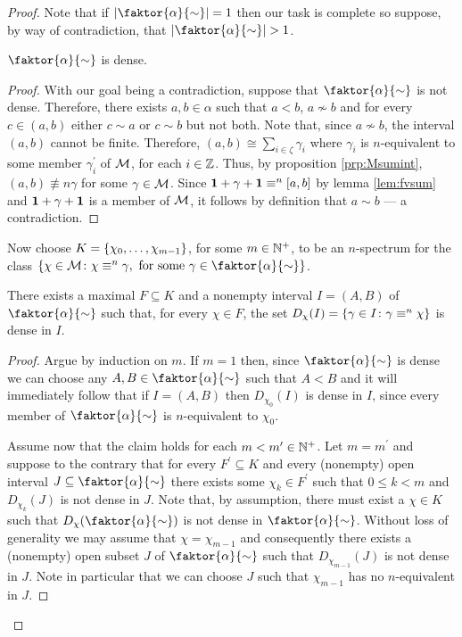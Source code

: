 \begin{proof}
	Note that if $\card{\faktor{\alpha}{\sim}}=1$ then our task is complete so
	suppose, by way of contradiction, that $\card{\faktor{\alpha}{\sim}}>1$.
	\begin{claim} $\faktor{\alpha}{\sim}$ is dense.
	\end{claim}
	\begin{proof} With our goal being a contradiction, suppose that
		$\faktor{\alpha}{\sim}$ is not dense.  Therefore, there exists $a,b\in\alpha$
		such that $a<b$, $a\not\sim b$ and for every $c\in(a,b)$ either $c\sim a$ or
		$c\sim b$ but not both.  Note that, since $a\not\sim b$, the interval $(a,b)$
		cannot be finite.  Therefore, $(a,b)\cong\sum_{i\in\zeta}\gamma_i$ where
		$\gamma_i$ is $n$-equivalent to some member $\gamma_i^\prime$ of $\mathcal{M}$, for each
		$i\in\mathbb{Z}$.  Thus, by proposition \ref{prp:Msumint}, $(a,b)\nequiv{n}\gamma$
		for some $\gamma\in\mathcal{M}$.  Since $\mathbf{1}+\gamma+\mathbf{1}\equiv^{n}[a,b]$ by lemma
		\ref{lem:fvsum} and $\mathbf{1}+\gamma+\mathbf{1}$ is a member of $\mathcal{M}$, it follows by
		definition that $a\sim b$ --- a contradiction.
	\end{proof}

	Now choose $K=\left\lbrace \chi_0,\dotsc,\chi_{m-1}\right\rbrace$, for some $m\in\mathbb{N}^{+}$, to
	be an $n$-spectrum for the class
	$\setbuild{\chi\in\M}{\chi\nequiv{n}\gamma,\text{ for some
			}\gamma\in\faktor{\alpha}{\sim}}$.
	\begin{claim} There exists a maximal $F\subseteq K$ and a nonempty interval
		$I=(A,B)$ of $\faktor{\alpha}{\sim}$ such that, for every $\chi\in F$, the set
		$D_\chi(I)=\left\lbrace \gamma\in I\colon \gamma\equiv^{n}\chi \right\rbrace$ is dense in $I$.
	\end{claim}
	\begin{proof} Argue by induction on $m$.  If $m=1$ then, since
		$\faktor{\alpha}{\sim}$ is dense we can choose any $A,B\in\faktor{\alpha}{\sim}$
		such that $A<B$ and it will immediately follow that if $I=(A,B)$ then
		$D_{\chi_0}(I)$ is dense in $I$, since every member of $\faktor{\alpha}{\sim}$
		is $n$-equivalent to $\chi_0$.

		Assume now that the claim holds for each $m<m^\prime\in\mathbb{N}^{+}$.  Let
		$m=m^\prime$ and suppose to the contrary that for every $F^\prime\subseteq K$
		and every (nonempty) open interval $J\subseteq\faktor{\alpha}{\sim}$ there
		exists some $\chi_k\in F^\prime$ such that $0\leq k<m$ and $D_{\chi_k}(J)$ is
		not dense in $J$.  Note that, by assumption, there must exist a $\chi\in K$ such
		that $D_{\chi}(\faktor{\alpha}{\sim})$ is not dense in $\faktor{\alpha}{\sim}$.
		Without loss of generality we may assume that $\chi=\chi_{m-1}$ and consequently
		there exists a (nonempty) open subset $J$ of $\faktor{\alpha}{\sim}$ such that
		$D_{\chi_{m-1}}(J)$ is not dense in $J$.  Note in particular that we can choose
		$J$ such that $\chi_{m-1}$ has no $n$-equivalent in $J$.


\end{proof}
\end{proof}
